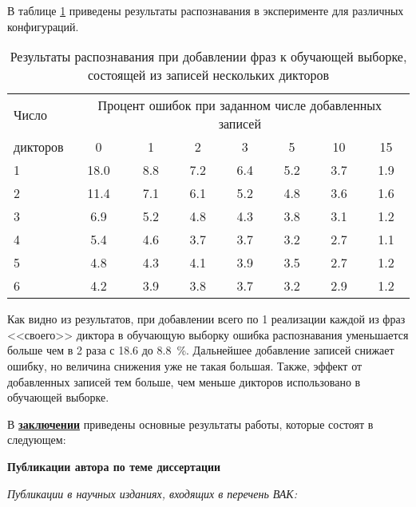 В таблице \ref{tab:4_3} приведены результаты распознавания в эксперименте для различных конфигураций.
\begin{table}[h]
	\centering
	\caption{Результаты распознавания при добавлении фраз к обучающей выборке, состоящей из записей нескольких дикторов}
	\label{tab:4_3}
	\begin{tabular}{| l | c | c | c | c | c | c | c |}
		\hline
		Число & \multicolumn{7}{c|}{Процент ошибок при заданном числе добавленных записей} \\
		\hhline{~-------}
		дикторов & \phantom{00}0\phantom{00} & \phantom{00}1\phantom{00} & \phantom{00}2\phantom{00} & \phantom{00}3\phantom{00} & \phantom{00}5\phantom{00} & \phantom{00}10\phantom{00} & \phantom{00}15\phantom{00} \\
		\hline
		1 		 & 18.0 & 8.8 & 7.2 & 6.4 & 5.2 & 3.7 & 1.9 \\
		2 		 & 11.4 & 7.1 & 6.1 & 5.2 & 4.8 & 3.6 & 1.6 \\
		3 		 &  6.9 & 5.2 & 4.8 & 4.3 & 3.8 & 3.1 & 1.2 \\
		4 		 &  5.4 & 4.6 & 3.7 & 3.7 & 3.2 & 2.7 & 1.1 \\
		5 		 &  4.8 & 4.3 & 4.1 & 3.9 & 3.5 & 2.7 & 1.2 \\
		6 		 &  4.2 & 3.9 & 3.8 & 3.7 & 3.2 & 2.9 & 1.2 \\
		\hline
	\end{tabular}
\end{table}

Как видно из результатов, при добавлении всего по 1 реализации каждой из фраз <<своего>> диктора в обучающую выборку ошибка распознавания уменьшается больше чем в 2 раза с 18.6 до 8.8~\%.
Дальнейшее добавление записей снижает ошибку, но величина снижения уже не такая большая.
Также, эффект от добавленных записей тем больше, чем меньше дикторов использовано в обучающей выборке.

В \underline{\textbf{заключении}} приведены основные результаты работы, которые состоят в следующем:




\begin{center}
	{\fontsize{11}{13}\selectfont \textbf{Публикации автора по теме диссертации}}
\end{center} 

\noindent
\textit{Публикации в научных изданиях, входящих в перечень ВАК:}
\medskip


